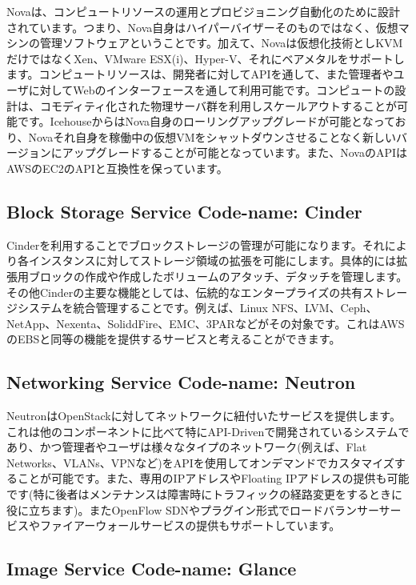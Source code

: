 \documentclass[8pt,b5paper,tombo,openany]{jsbook}
\begin{document}
Novaは、コンピュートリソースの運用とプロビジョニング自動化のために設計されています。つまり、Nova自身はハイパーバイザーそのものではなく、仮想マシンの管理ソフトウェアということです。加えて、Novaは仮想化技術としKVMだけではなくXen、VMware ESX(i)、Hyper-V、それにベアメタルをサポートします。コンピュートリソースは、開発者に対してAPIを通して、また管理者やユーザに対してWebのインターフェースを通して利用可能です。コンピュートの設計は、コモディティ化された物理サーバ群を利用しスケールアウトすることが可能です。IcehouseからはNova自身のローリングアップグレードが可能となっており、Novaそれ自身を稼働中の仮想VMをシャットダウンさせることなく新しいバージョンにアップグレードすることが可能となっています。また、NovaのAPIはAWSのEC2のAPIと互換性を保っています。

\subsection{Block Storage Service Code-name: Cinder}

Cinderを利用することでブロックストレージの管理が可能になります。それにより各インスタンスに対してストレージ領域の拡張を可能にします。具体的には拡張用ブロックの作成や作成したボリュームのアタッチ、デタッチを管理します。その他Cinderの主要な機能としては、伝統的なエンタープライズの共有ストレージシステムを統合管理することです。例えば、Linux NFS、LVM、Ceph、NetApp、Nexenta、SoliddFire、EMC、3PARなどがその対象です。これはAWSのEBSと同等の機能を提供するサービスと考えることができます。

\subsection{Networking Service Code-name: Neutron}

NeutronはOpenStackに対してネットワークに紐付いたサービスを提供します。これは他のコンポーネントに比べて特にAPI-Drivenで開発されているシステムであり、かつ管理者やユーザは様々なタイプのネットワーク(例えば、Flat Networks、VLANs、VPNなど)をAPIを使用してオンデマンドでカスタマイズすることが可能です。また、専用のIPアドレスやFloating IPアドレスの提供も可能です(特に後者はメンテナンスは障害時にトラフィックの経路変更をするときに役に立ちます)。またOpenFlow SDNやプラグイン形式でロードバランサーサービスやファイアーウォールサービスの提供もサポートしています。

\subsection{Image Service Code-name: Glance}
\end{document}
